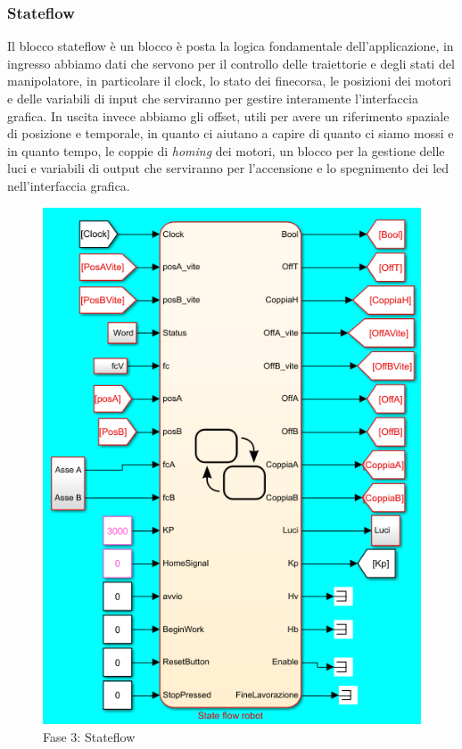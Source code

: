 \subsubsection*{Stateflow}
Il blocco stateflow è un blocco è posta la logica fondamentale dell'applicazione, in ingresso abbiamo dati che servono per il controllo delle traiettorie e degli stati del manipolatore, in particolare il clock, lo stato dei finecorsa, le posizioni dei motori e delle variabili di input che serviranno per gestire interamente l'interfaccia grafica. In uscita invece abbiamo gli offset, utili per avere un riferimento spaziale di posizione e temporale, in quanto ci aiutano a capire di quanto ci siamo mossi e in quanto tempo, le coppie di \textit{homing} dei motori, un blocco per la gestione delle luci e variabili di output che serviranno per l'accensione e lo spegnimento dei led nell'interfaccia grafica.
\begin{figure}[ht]
	\begin{center}
		\includegraphics[scale=1]{Immagini/Sperimentale/sf0}
		\caption{Fase 3: Stateflow}
		\label{fig:Stateflow1}
	\end{center}
\end{figure}

